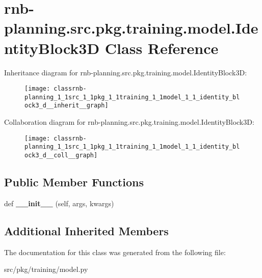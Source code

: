 \hypertarget{classrnb-planning_1_1src_1_1pkg_1_1training_1_1model_1_1_identity_block3_d}{}\section{rnb-\/planning.src.\+pkg.\+training.\+model.\+Identity\+Block3D Class Reference}
\label{classrnb-planning_1_1src_1_1pkg_1_1training_1_1model_1_1_identity_block3_d}


Inheritance diagram for rnb-\/planning.src.\+pkg.\+training.\+model.\+Identity\+Block3D\+:
\nopagebreak
\begin{figure}[H]
\begin{center}
\leavevmode
\texttt{[image: classrnb-planning\_1\_1src\_1\_1pkg\_1\_1training\_1\_1model\_1\_1\_identity\_block3\_d\_\_inherit\_\_graph]}
\end{center}
\end{figure}


Collaboration diagram for rnb-\/planning.src.\+pkg.\+training.\+model.\+Identity\+Block3D\+:
\nopagebreak
\begin{figure}[H]
\begin{center}
\leavevmode
\texttt{[image: classrnb-planning\_1\_1src\_1\_1pkg\_1\_1training\_1\_1model\_1\_1\_identity\_block3\_d\_\_coll\_\_graph]}
\end{center}
\end{figure}
\subsection*{Public Member Functions}
\begin{DoxyCompactItemize}
\item 
\mbox{\label{classrnb-planning_1_1src_1_1pkg_1_1training_1_1model_1_1_identity_block3_d_ab50c992ec63e49fed83b9aebb43423a0}} 
def {\bfseries \+\_\+\+\_\+init\+\_\+\+\_\+} (self, args, kwargs)
\end{DoxyCompactItemize}
\subsection*{Additional Inherited Members}


The documentation for this class was generated from the following file\+:\begin{DoxyCompactItemize}
\item 
src/pkg/training/model.\+py\end{DoxyCompactItemize}
